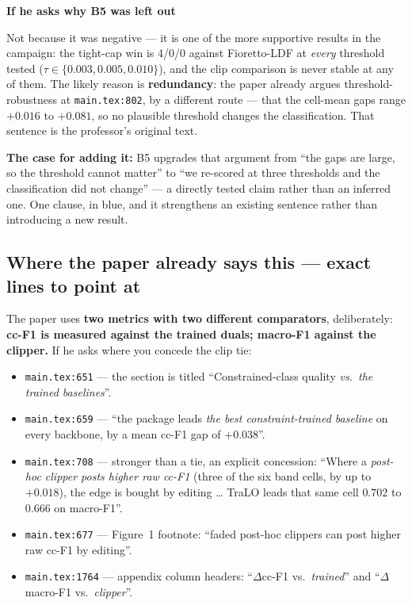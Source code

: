 \documentclass[11pt,a4paper]{article}
\newenvironment{callout}[1]
  {\par\medskip\noindent\begin{lrbox}{\calloutbox}%
   \begin{minipage}{\dimexpr\linewidth-20pt\relax}%
   \textbf{#1}\par\smallskip}
  {\end{minipage}\end{lrbox}%
   \setlength{\fboxsep}{10pt}%
   \colorbox{boxgrey}{\usebox{\calloutbox}}\par\medskip}
\begin{document}
\begin{callout}{If he asks why B5 was left out}
Not because it was negative --- it is one of the more supportive results in the campaign:
the tight-cap win is 4/0/0 against Fioretto-LDF at \emph{every} threshold tested
($\tau\in\{0.003,0.005,0.010\}$), and the clip comparison is never stable at any of them.
The likely reason is \textbf{redundancy}: the paper already argues threshold-robustness at
\texttt{main.tex:802}, by a different route --- that the cell-mean gaps range $+0.016$ to
$+0.081$, so no plausible threshold changes the classification. That sentence is the
professor's original text.

\smallskip
\textbf{The case for adding it:} B5 upgrades that argument from ``the gaps are large, so
the threshold cannot matter'' to ``we re-scored at three thresholds and the classification
did not change'' --- a directly tested claim rather than an inferred one. One clause, in
blue, and it strengthens an existing sentence rather than introducing a new result.
\end{callout}

\subsection{Where the paper already says this --- exact lines to point at}
The paper uses \textbf{two metrics with two different comparators}, deliberately:
\textbf{cc-F1 is measured against the trained duals; macro-F1 against the clipper.} If he
asks where you concede the clip tie:

\begin{itemize}
\item \texttt{main.tex:651} --- the section is titled ``Constrained-class quality
\emph{vs.\ the trained baselines}''.
\item \texttt{main.tex:659} --- ``the package leads \emph{the best constraint-trained
baseline} on every backbone, by a mean cc-F1 gap of $+0.038$''.
\item \texttt{main.tex:708} --- stronger than a tie, an explicit concession: ``Where a
\emph{post-hoc clipper posts higher raw cc-F1} (three of the six band cells, by up to
$+0.018$), the edge is bought by editing \ldots{} TraLO leads that same cell $0.702$ to
$0.666$ on macro-F1''.
\item \texttt{main.tex:677} --- Figure~1 footnote: ``faded post-hoc clippers can post
higher raw cc-F1 by editing''.
\item \texttt{main.tex:1764} --- appendix column headers: ``$\Delta$cc-F1 vs.\
\emph{trained}'' and ``$\Delta$macro-F1 vs.\ \emph{clipper}''.
\end{itemize}
\end{document}
